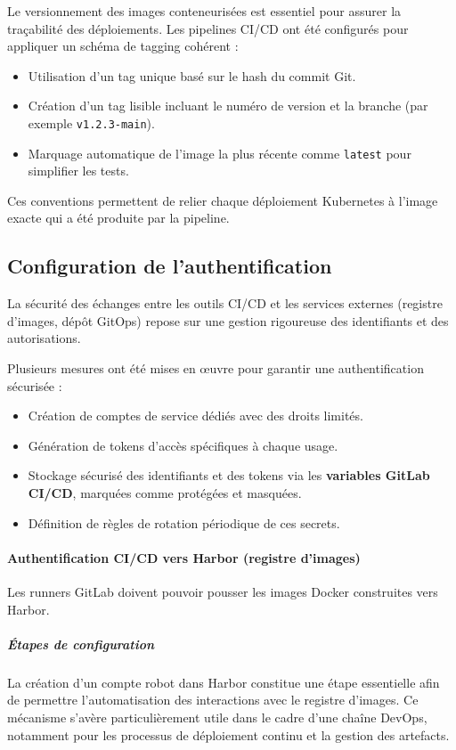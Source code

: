 Le versionnement des images conteneurisées est essentiel pour assurer la traçabilité des déploiements.
Les pipelines CI/CD ont été configurés pour appliquer un schéma de tagging cohérent :
\begin{itemize}
	\item Utilisation d’un tag unique basé sur le hash du commit Git.
	\item Création d’un tag lisible incluant le numéro de version et la branche (par exemple \texttt{v1.2.3-main}).
	\item Marquage automatique de l’image la plus récente comme \texttt{latest} pour simplifier les tests.
\end{itemize}

Ces conventions permettent de relier chaque déploiement Kubernetes à l’image exacte qui a été produite par la pipeline.

\subsection{Configuration de l’authentification}

La sécurité des échanges entre les outils CI/CD et les services externes (registre d’images, dépôt GitOps) repose sur une gestion rigoureuse des identifiants et des autorisations.

Plusieurs mesures ont été mises en œuvre pour garantir une authentification sécurisée :
\begin{itemize}
	\item Création de comptes de service dédiés avec des droits limités.
	\item Génération de tokens d’accès spécifiques à chaque usage.
	\item Stockage sécurisé des identifiants et des tokens via les \textbf{variables GitLab CI/CD}, marquées comme protégées et masquées.
	\item Définition de règles de rotation périodique de ces secrets.
\end{itemize}

\paragraph{Authentification CI/CD vers Harbor (registre d’images)}

Les runners GitLab doivent pouvoir pousser les images Docker construites vers Harbor.

\subparagraph{Étapes de configuration}

La création d’un compte robot dans Harbor constitue une étape essentielle afin de permettre l’automatisation des interactions avec le registre d’images. Ce mécanisme s’avère particulièrement utile dans le cadre d’une chaîne DevOps, notamment pour les processus de déploiement continu et la gestion des artefacts.

